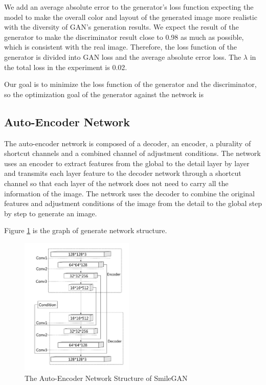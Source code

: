 We add an average absolute error to the generator's loss function expecting the model to make the overall color and layout of the generated image more realistic with the diversity of GAN's generation results.
We expect the result of the generator to make the discriminator result close to 0.98 as much as possible, which is consistent with the real image.
Therefore, the loss function of the generator is divided into GAN loss and the average absolute error loss.
The $\lambda$ in the total loss in the experiment is 0.02.

Our goal is to minimize the loss function of the generator and the discriminator, so the optimization goal of the generator against the network is %



\subsection{Auto-Encoder Network}
The auto-encoder network is composed of a decoder, an encoder, a plurality of shortcut channels and a combined channel of adjustment conditions.
The network uses an encoder to extract features from the global to the detail layer by layer and transmits each layer feature to the decoder network through a shortcut channel so that each layer of the network does not need to carry all the information of the image.
The network uses the decoder to combine the original features and adjustment conditions of the image from the detail to the global step by step to generate an image.

Figure \ref{net_auto-encoder} is the graph of generate network structure.

\begin{figure}
    \begin{center}
    \includegraphics[width=0.48\textwidth]{figures/net_auto-encoder.pdf}
    \caption{The Auto-Encoder Network Structure of SmileGAN}
    \label{net_auto-encoder}
    \end{center}
\end{figure}

